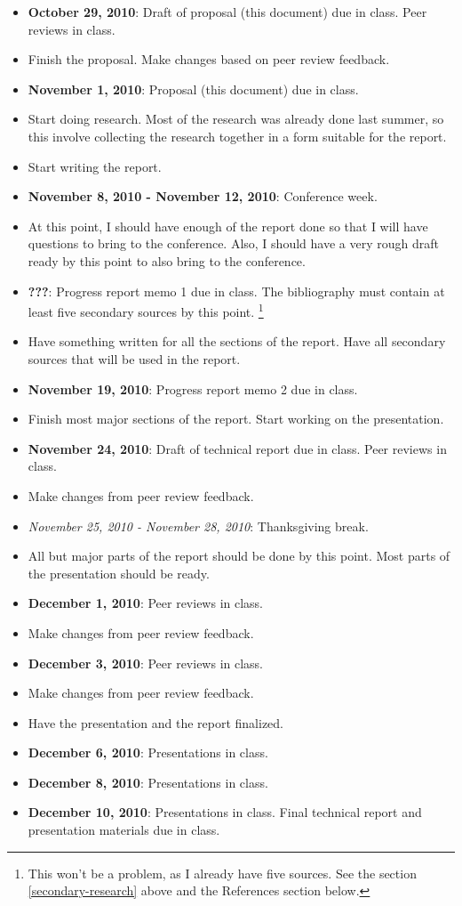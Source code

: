 \documentclass[12pt]{article}
\begin{document}
\begin{itemize}
\item \textbf{October 29, 2010}: Draft of proposal (this document) due
in class.  Peer reviews in class.
\item Finish the proposal.  Make changes based on peer review feedback.  
\item \textbf{November 1, 2010}: Proposal (this document) due in class. 
\item Start doing research.  Most of the research was already done last
summer, so this involve collecting the research together in a form
suitable for the report.
\item Start writing the report.  
\item \textbf{November 8, 2010 - November 12, 2010}: Conference week. 
\item At this point, I should have enough of the report done so that I
will have questions to bring to the conference.  Also, I should have a
very rough draft ready by this point to also bring to the conference.
\item \textbf{???}: Progress report memo 1 due in class.  The
bibliography must contain at least five secondary sources by this point.
\footnote{This won't be a problem, as I already have five sources.  See
the section \ref{secondary-research} above and the References section
below.}
\item Have something written for all the sections of the report.  Have
all secondary sources that will be used in the report.
\item \textbf{November 19, 2010}: Progress report memo 2 due in class.
\item Finish most major sections of the report.  Start working on the
presentation.
\item \textbf{November 24, 2010}: Draft of technical report due in
class.  Peer reviews in class.
\item Make changes from peer review feedback.
\item \textit{November 25, 2010 - November 28, 2010}: Thanksgiving break.
\item All but major parts of the report should be done by this point. 
Most parts of the presentation should be ready.
\item \textbf{December 1, 2010}: Peer reviews in class.
\item Make changes from peer review feedback.
\item \textbf{December 3, 2010}: Peer reviews in class.
\item Make changes from peer review feedback.
\item Have the presentation and the report finalized.
\item \textbf{December 6, 2010}: Presentations in class.
\item \textbf{December 8, 2010}: Presentations in class.
\item \textbf{December 10, 2010}: Presentations in class.  Final
technical report and presentation materials due in class.
\end{itemize}
\end{document}
